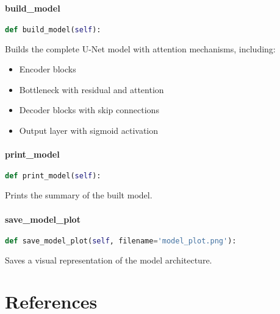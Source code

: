 \documentclass{article}
\begin{document}
\paragraph{build\_model}
\begin{lstlisting}[language=Python]
def build_model(self):
\end{lstlisting}
Builds the complete U-Net model with attention mechanisms, including:
\begin{itemize}
    \item Encoder blocks
    \item Bottleneck with residual and attention
    \item Decoder blocks with skip connections
    \item Output layer with sigmoid activation
\end{itemize}

\paragraph{print\_model}
\begin{lstlisting}[language=Python]
def print_model(self):
\end{lstlisting}
Prints the summary of the built model.

\paragraph{save\_model\_plot}
\begin{lstlisting}[language=Python]
def save_model_plot(self, filename='model_plot.png'):
\end{lstlisting}
Saves a visual representation of the model architecture.

\section{References}



\end{document}
